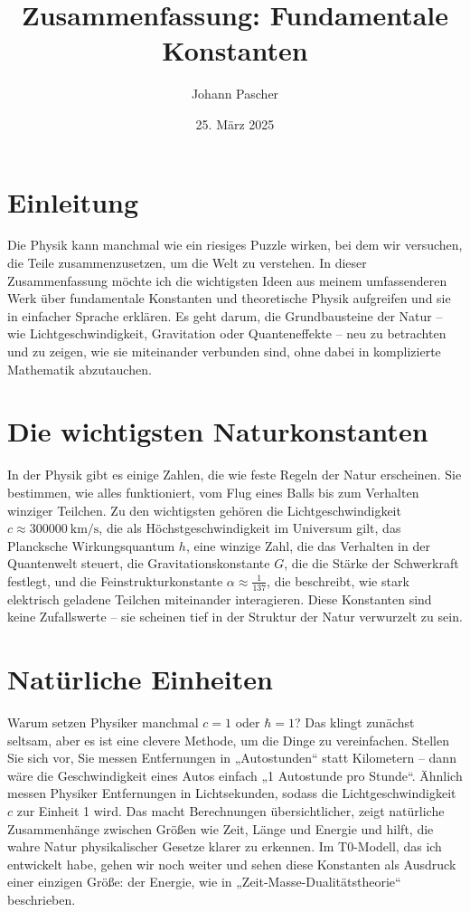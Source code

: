\documentclass[a4paper,12pt]{article}
\title{Zusammenfassung: Fundamentale Konstanten}
\author{Johann Pascher}
\date{25. März 2025}
\begin{document}
	
	\maketitle
	
	\section{Einleitung}
	
	Die Physik kann manchmal wie ein riesiges Puzzle wirken, bei dem wir versuchen, die Teile zusammenzusetzen, um die Welt zu verstehen. In dieser Zusammenfassung möchte ich die wichtigsten Ideen aus meinem umfassenderen Werk über fundamentale Konstanten und theoretische Physik aufgreifen und sie in einfacher Sprache erklären. Es geht darum, die Grundbausteine der Natur – wie Lichtgeschwindigkeit, Gravitation oder Quanteneffekte – neu zu betrachten und zu zeigen, wie sie miteinander verbunden sind, ohne dabei in komplizierte Mathematik abzutauchen.
	
	\section{Die wichtigsten Naturkonstanten}
	
	In der Physik gibt es einige Zahlen, die wie feste Regeln der Natur erscheinen. Sie bestimmen, wie alles funktioniert, vom Flug eines Balls bis zum Verhalten winziger Teilchen. Zu den wichtigsten gehören die Lichtgeschwindigkeit \(c \approx \SI{300000}{\kilo\meter\per\second}\), die als Höchstgeschwindigkeit im Universum gilt, das Plancksche Wirkungsquantum \(h\), eine winzige Zahl, die das Verhalten in der Quantenwelt steuert, die Gravitationskonstante \(G\), die die Stärke der Schwerkraft festlegt, und die Feinstrukturkonstante \(\alpha \approx \frac{1}{137}\), die beschreibt, wie stark elektrisch geladene Teilchen miteinander interagieren. Diese Konstanten sind keine Zufallswerte – sie scheinen tief in der Struktur der Natur verwurzelt zu sein.
	
	\section{Natürliche Einheiten}
	
	Warum setzen Physiker manchmal \(c = 1\) oder \(\hbar = 1\)? Das klingt zunächst seltsam, aber es ist eine clevere Methode, um die Dinge zu vereinfachen. Stellen Sie sich vor, Sie messen Entfernungen in „Autostunden“ statt Kilometern – dann wäre die Geschwindigkeit eines Autos einfach „1 Autostunde pro Stunde“. Ähnlich messen Physiker Entfernungen in Lichtsekunden, sodass die Lichtgeschwindigkeit \(c\) zur Einheit 1 wird. Das macht Berechnungen übersichtlicher, zeigt natürliche Zusammenhänge zwischen Größen wie Zeit, Länge und Energie und hilft, die wahre Natur physikalischer Gesetze klarer zu erkennen. Im T0-Modell, das ich entwickelt habe, gehen wir noch weiter und sehen diese Konstanten als Ausdruck einer einzigen Größe: der Energie, wie in „Zeit-Masse-Dualitätstheorie“ \cite{pascher_params_2025} beschrieben.
	
\end{document}

